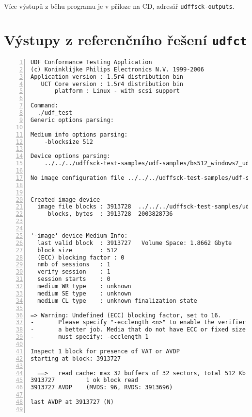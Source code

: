 Více výstupů z běhu programu je v příloze na CD, adresář \texttt{udffsck-outputs}.

\chapter{Výstupy z referenčního řešení \texttt{udfct}}
\begin{lstlisting}[frame=single,caption={Výsledek kontroly poškozeného média referenčním programem \texttt{udfct}},label=lst:udfct-broken,basicstyle=\ttfamily\scriptsize, keywordstyle=\color{black}\bfseries\underbar,nolol,numbers=left,texcl=false,escapechar=!]
UDF Conformance Testing Application
(c) Koninklijke Philips Electronics N.V. 1999-2006
Application version : 1.5r4 distribution bin
   UCT Core version : 1.5r4 distribution bin
       platform : Linux - with scsi support

Command:
  ./udf_test
Generic options parsing:

Medium info options parsing:
    -blocksize 512

Device options parsing:
    ../../../udffsck-test-samples/udf-samples/bs512_windows7_udf0201_broken_file_tree.img

No image configuration file ../../../udffsck-test-samples/udf-samples/bs512_windows7_udf0201_broken_file_tree.cfg


Created image device
  image file blocks : 3913728  ../../../udffsck-test-samples/udf-samples/bs512_windows7_udf0201_broken_file_tree.img
     blocks, bytes  : 3913728  2003828736


'-image' device Medium Info:
  last valid block  : 3913727   Volume Space: 1.8662 Gbyte
  block size        : 512
  (ECC) blocking factor : 0
  nmb of sessions   : 1
  verify session    : 1
  session starts    : 0       
  medium WR type    : unknown
  medium SE type    : unknown
  medium CL type    : unknown finalization state

=> Warning: Undefined (ECC) blocking factor, set to 16.
-       Please specify "-ecclength <n>" to enable the verifier to do
-       a better job. Media that do not have ECC or fixed size packets
-       must specify: -ecclength 1

Inspect 1 block for presence of VAT or AVDP
starting at block: 3913727

  ==>   read cache: max 32 buffers of 32 sectors, total 512 Kb
3913727         1 ok block read
3913727 AVDP    (MVDS: 96, RVDS: 3913696)

last AVDP at 3913727 (N)


\end{lstlisting}
